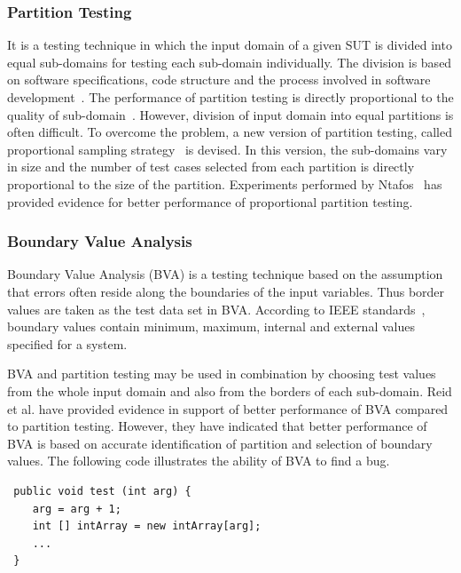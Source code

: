 \subsubsection{Partition Testing}
It is a testing technique in which the input domain of a given SUT is divided into equal sub-domains for testing each sub-domain individually. The division is based on software specifications, code structure and the process involved in software development~\cite{hamlet1990partition}. The performance of partition testing is directly proportional to the quality of sub-domain~\cite{weyuker1991analyzing}. However, division of input domain into equal partitions is often difficult. To overcome the problem, a new version of partition testing, called proportional sampling strategy~\cite{chan1996proportional} is devised. In this version, the sub-domains vary in size and the number of test cases selected from each partition is directly proportional to the size of the partition. Experiments performed by Ntafos~\cite{ntafos1998random} has provided evidence for better performance of proportional partition testing.


\subsubsection{Boundary Value Analysis}
Boundary Value Analysis (BVA) is a testing technique based on the assumption that errors often reside along the boundaries of the input variables. Thus border values are taken as the test data set in BVA. According to IEEE standards~\cite{radatz1990ieee}, boundary values contain minimum, maximum, internal and external values specified for a system. 

BVA and partition testing may be used in combination by choosing test values from the whole input domain and also from the borders of each sub-domain. Reid et al. \cite{reid1997empirical} have provided evidence in support of better performance of BVA compared to partition testing. However, they have indicated that better performance of BVA is based on accurate identification of partition and selection of boundary values. The following code illustrates the ability of BVA to find a bug. 

\begin{lstlisting}
 public void test (int arg) {
	arg = arg + 1;
	int [] intArray = new intArray[arg];
	...
 }
\end{lstlisting}

